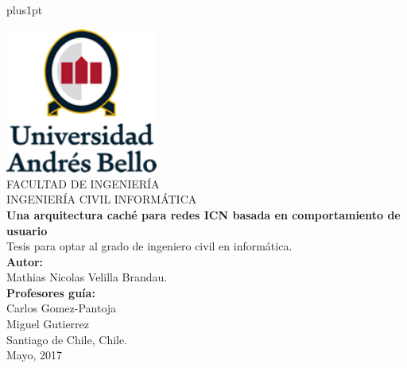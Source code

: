 \documentclass[12pt]{ociamthesis}  %
\begin{document}
\baselineskip=18pt plus1pt


\setcounter{secnumdepth}{3}
\setcounter{tocdepth}{2}


\begin{titlepage}
	\begin{center}
		\includegraphics[width=5cm]{logo2.png}\\
		\vspace{1cm}
		FACULTAD DE INGENIERÍA\\
		INGENIERÍA CIVIL INFORMÁTICA\\
		\vspace{1cm}
		\LARGE{\textbf{Una arquitectura caché para redes ICN basada en comportamiento de usuario} \\}
		\vspace{1cm}
		\small{Tesis para optar al grado de ingeniero civil en informática.}\\
		\vspace{2cm}
		\textbf{Autor:} \\
		Mathias Nicolas Velilla Brandau.\\
		\vspace{1cm}
		\textbf{Profesores guía:} \\
		Carlos Gomez-Pantoja\\
		Miguel Gutierrez\\
		\vspace{1cm}
		Santiago de Chile, Chile.\\
		\vspace{1cm}
		Mayo, 2017
	\end{center}
\end{titlepage}
\end{document}

